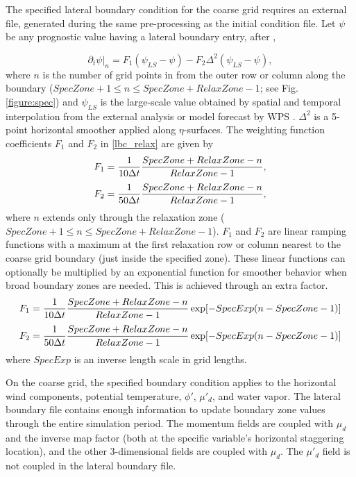 The specified lateral boundary condition for the coarse grid 
requires an external file, generated
during the same pre-processing as the initial condition file.
Let $\psi$ be any prognostic value having a lateral boundary entry, after \cite{daviesturner77},

\begin{equation}
\partial_t \psi \big|_n = F_1(\psi_{LS} - \psi) - F_2 \Delta^2(\psi_{LS} - \psi),
\label{lbc_relax}
\end{equation}
\noindent where $n$ is the number of grid points in from the outer row or column along the boundary
($SpecZone + 1 \leq n \leq SpecZone + RelaxZone - 1$; see Fig. \ref{figure:spec}) 
and $\psi_{LS}$ is the large-scale value obtained by spatial and temporal interpolation from the external analysis or model forecast by WPS .  $\Delta^2$
is a 5-point horizontal smoother applied along $\eta$-surfaces.
The weighting function
coefficients $F_1$ and $F_2$ in \eqref{lbc_relax} are given by
\begin{equation}
F_1 = {1 \over {10 \Delta t }} {{SpecZone + RelaxZone - n} \over {RelaxZone - 1}},
\notag
\end{equation}
\begin{equation}
F_2 = {1 \over {50 \Delta t }} {{SpecZone + RelaxZone - n} \over {RelaxZone - 1}},
\notag
\end{equation}
\noindent where $n$ extends only through the relaxation zone 
($SpecZone + 1 \leq n \leq SpecZone + RelaxZone - 1$).
$F_1$ and $F_2$ are
linear ramping functions with a maximum at the first relaxation row or column 
nearest to the coarse grid boundary (just inside the specified zone).  
These linear functions can optionally be multiplied by an
exponential function for smoother behavior when broad boundary zones are
needed. This is achieved through an extra factor.
\begin{equation}
F_1 = {1 \over {10 \Delta t }} {{SpecZone + RelaxZone - n} \over {RelaxZone - 1}}
\exp [ - SpecExp ( n - SpecZone - 1)]
\notag
\end{equation}
\begin{equation}
F_2 = {1 \over {50 \Delta t }} {{SpecZone + RelaxZone - n} \over {RelaxZone - 1}}
\exp [ - SpecExp ( n - SpecZone - 1)]
\notag
\end{equation}
where $SpecExp$ is an inverse length scale in grid lengths.

On the coarse grid, the specified boundary condition applies to 
the horizontal wind components, potential temperature, $\phi'$, $\mu'_d$, and water vapor. 
The lateral boundary file contains enough information to update
boundary zone values through the entire simulation period.  The momentum fields are 
coupled with $\mu_d$ and the inverse map factor (both at the specific variable's
horizontal staggering location), and the other 3-dimensional fields are coupled with
$\mu_d$.  The $\mu'_d$ field is not coupled in the lateral boundary file.

